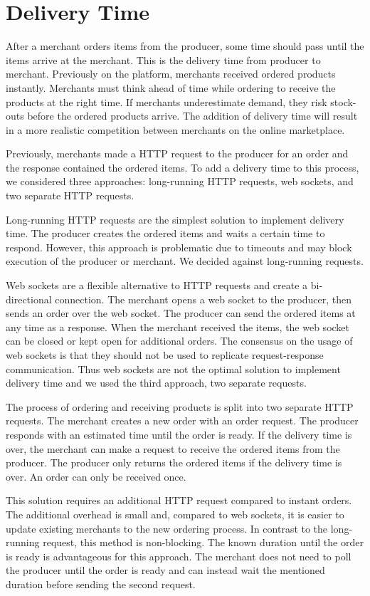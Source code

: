 \section{Delivery Time}
\label{section:shipping_time}
After a merchant orders items from the producer, some time should pass until the items arrive at the merchant.
This is the delivery time from producer to merchant.
Previously on the \pricewars platform, merchants received ordered products instantly.
Merchants must think ahead of time while ordering to receive the products at the right time.
If merchants underestimate demand, they risk stock-outs before the ordered products arrive.
The addition of delivery time will result in a more realistic competition between merchants on the online marketplace.

Previously, merchants made a HTTP request to the producer for an order and the response contained the ordered items.
To add a delivery time to this process, we considered three approaches: long-running HTTP requests, web sockets, and two separate HTTP requests. 

Long-running HTTP requests are the simplest solution to implement delivery time.
The producer creates the ordered items and waits a certain time to respond.
However, this approach is problematic due to timeouts and may block execution of the producer or merchant.
We decided against long-running requests.

Web sockets are a flexible alternative to HTTP requests and create a bi-directional connection.
The merchant opens a web socket to the producer, then sends an order over the web socket.
The producer can send the ordered items at any time as a response.
When the merchant received the items, the web socket can be closed or kept open for additional orders.
The consensus on the usage of web sockets is that they should not be used to replicate request-response communication.
Thus web sockets are not the optimal solution to implement delivery time and we used the third approach, two separate requests.

The process of ordering and receiving products is split into two separate HTTP requests.
The merchant creates a new order with an order request.
The producer responds with an estimated time until the order is ready.
If the delivery time is over, the merchant can make a request to receive the ordered items from the producer.
The producer only returns the ordered items if the delivery time is over.
An order can only be received once.

This solution requires an additional HTTP request compared to instant orders.
The additional overhead is small and, compared to web sockets, it is easier to update existing merchants to the new ordering process.
In contrast to the long-running request, this method is non-blocking.
The known duration until the order is ready is advantageous for this approach.
The merchant does not need to poll the producer until the order is ready and can instead wait the mentioned duration before sending the second request.

